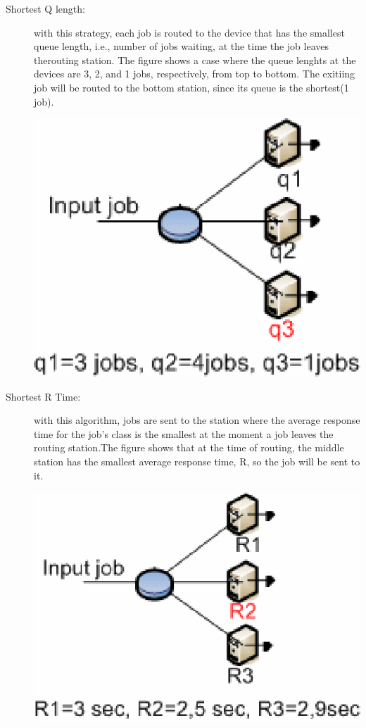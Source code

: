 \begin{description}
\begin{center}
\end{center}
\item[Shortest Q length:] with this strategy, each job is routed to the device that has the smallest queue length, i.e., number of jobs waiting, at the time the job leaves therouting station. The figure shows a case where the queue lenghts at the devices are 3, 2, and 1 jobs, respectively, from top to bottom. The exitiing job will be routed to the bottom station, since its queue is the shortest(1 job).
\begin{center}
\includegraphics[scale=.5]{img/jsim/Q_length.eps}
\end{center}
\item[Shortest R Time:] with this algorithm, jobs are sent to the station where the average response time for the job's class is the smallest at the moment a job leaves the routing station.The figure shows that at the time of routing, the middle station has the smallest average response time, R, so the job will be sent to it.
\begin{center}
\includegraphics[scale=.5]{img/jsim/R_length.eps}

\end{center}
\end{description}
